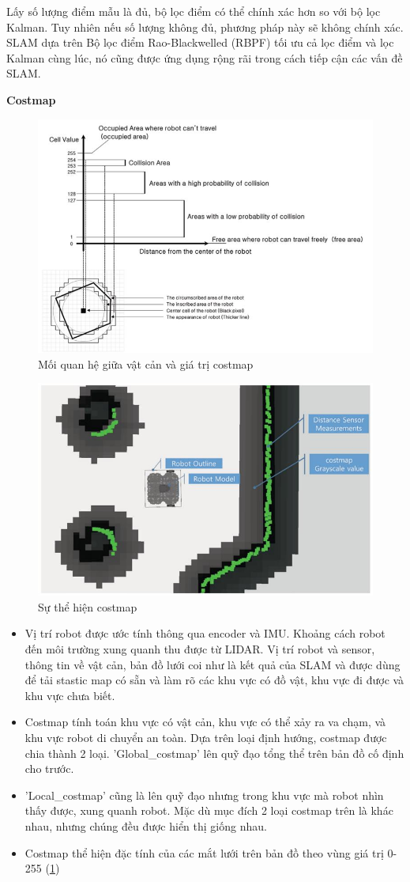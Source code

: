 Lấy  số lượng điểm mẫu là đủ,  bộ lọc  điểm có thể chính xác hơn so với bộ lọc Kalman.  Tuy nhiên nếu  số lượng không đủ,  phương pháp này  sẽ không chính xác.  SLAM dựa trên  Bộ lọc điểm Rao-Blackwelled (RBPF)  tối ưu cả lọc điểm và lọc Kalman  cùng  lúc,  nó cũng  được ứng dụng rộng rãi trong  
cách tiếp cận các vấn đề SLAM.  

\textbf{Costmap}\\
\begin{figure}[tph]
	\centering
	\includegraphics[width=0.7\linewidth]{chapter2/figs/costmap}
	\caption{Mối quan hệ giữa vật cản và giá trị costmap}
	\label{fig:costmap}
\end{figure}
\begin{figure}[tph]
	\centering
	\includegraphics[width=0.7\linewidth]{chapter2/figs/costmap1}
	\caption{Sự thể hiện costmap}
	\label{fig:costmap1}
\end{figure}
\begin{itemize}
	\item Vị trí robot được ước tính thông qua encoder và IMU. Khoảng cách robot đến môi trường xung quanh thu được từ LIDAR. Vị trí robot và sensor, thông tin về vật cản, bản đồ lưới coi như là kết quả của SLAM và được dùng để tải stastic map có sẵn và làm rõ các khu vực có đồ vật, khu vực đi được và khu vực chưa biết.
	\item Costmap tính toán khu vực có vật cản, khu vực có thể xảy ra va chạm, và khu vực robot di chuyển an toàn. Dựa trên loại định hướng, costmap được chia thành 2 loại. 'Global\_costmap' lên quỹ đạo tổng thể trên bản đồ cố định cho trước.
	\item 'Local\_costmap' cũng là lên quỹ đạo nhưng trong khu vực mà robot nhìn thấy được, xung quanh robot. Mặc dù mục đích 2 loại costmap trên là khác nhau, nhưng chúng đều được hiển thị giống nhau.
	\item Costmap thể hiện đặc tính của các mắt lưới trên bản đồ theo vùng giá trị 0-255 (\figurename{\ref{fig:costmap}})
\end{itemize}

